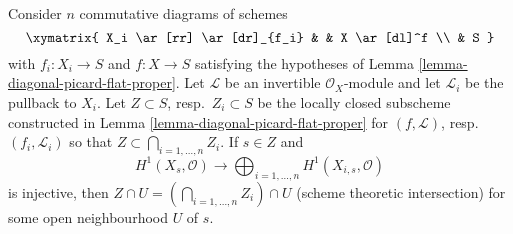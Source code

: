 \begin{lemma}
\label{lemma-H1-O-multiple-picard-flat-proper}
Consider $n$ commutative diagrams of schemes
$$
\xymatrix{
X_i \ar[rr] \ar[dr]_{f_i} & & X \ar[dl]^f \\
& S
}
$$
with $f_i : X_i \to S$ and $f : X \to S$ satisfying the hypotheses of
Lemma \ref{lemma-diagonal-picard-flat-proper}.
Let $\mathcal{L}$ be an invertible $\mathcal{O}_X$-module
and let $\mathcal{L}_i$ be the pullback to $X_i$. Let $Z \subset S$,
resp.\ $Z_i \subset S$ be the locally closed subscheme constructed
in Lemma \ref{lemma-diagonal-picard-flat-proper}
for $(f, \mathcal{L})$, resp.\ $(f_i, \mathcal{L}_i)$
so that $Z \subset \bigcap_{i = 1, \ldots, n} Z_i$. If $s \in Z$ and
$$
H^1(X_s, \mathcal{O}) \longrightarrow
\bigoplus\nolimits_{i = 1, \ldots, n} H^1(X_{i, s}, \mathcal{O})
$$
is injective, then $Z \cap U = (\bigcap_{i = 1, \ldots, n} Z_i) \cap U$
(scheme theoretic intersection) for some open neighbourhood $U$ of $s$.
\end{lemma}

